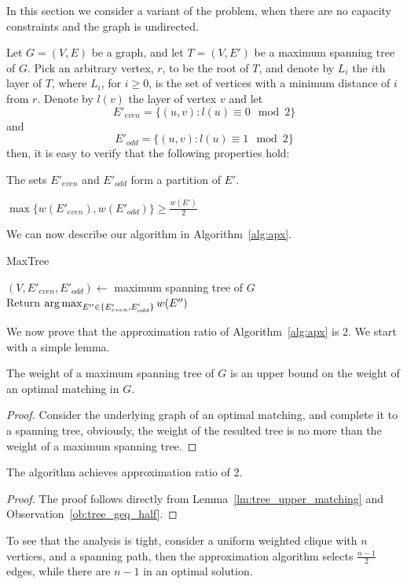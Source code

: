 \label{sub:ucudcm}
In this section we consider a variant of the problem, 
when there are no capacity constraints and the graph is undirected.

Let $G = (V, E)$ be a graph, 
and let $T = (V, E')$ be a maximum spanning tree of $G$.
Pick an arbitrary vertex, $r$, to be the root of $T$, 
and denote by $L_i$ the $i$th layer of $T$, 
where $L_i$, for $i \geq 0$, is the set of vertices with a minimum distance of $i$ from $r$.
Denote by $l(v)$ the layer of vertex $v$ and let 
$$ E'_{even} = \{ (u, v) : l(u) \equiv 0 \mod 2 \} $$
and    
$$ E'_{odd} = \{ (u, v) : l(u) \equiv 1 \mod 2 \} $$
then, it is easy to verify that the following properties hold:

\begin{observation}
The sets $E'_{even}$ and $E'_{odd}$ form a partition of $E'$. 
\end{observation}

\begin{observation}
\label{ob:tree_geq_half}
$ \max\{w(E'_{even}), w(E'_{odd})\}  \geq \frac{w(E')}{2} $
\end{observation}

We can now describe our algorithm in Algorithm~\ref{alg:apx}.

\begin{algorithm}
\label{alg:apx}
\caption{MaxTree}
$(V, E'_{even}, E'_{odd}) \leftarrow$ maximum spanning tree of $G$		\\
Return $\operatorname*{arg\,max}_{E'' \in \{ E'_{even}, E'_{odd} \}}{w(E'')} $	\\
\end{algorithm}

We now prove that the approximation ratio of Algorithm~\ref{alg:apx} is 2.
We start with a simple lemma.

\begin{lemma}
\label{lm:tree_upper_matching}
The weight of a maximum spanning tree of $G$ is an upper bound on the weight of
an optimal matching in $G$.
\end{lemma}

\begin{proof}
Consider the underlying graph of an optimal matching, and complete it to a spanning tree, obviously, the
weight of the resulted tree is no more than the weight of a maximum spanning
tree.
\end{proof}

\begin{theorem}
The \UCUDCARPOOL{} algorithm achi\-eves approximation ratio of 2.
\end{theorem}

\begin{proof}
The proof follows directly from 
Lemma~\ref{lm:tree_upper_matching} and Observation~\ref{ob:tree_geq_half}.
\end{proof}

To see that the analysis is tight, 
consider a uniform weighted clique with $n$ vertices, 
and a spanning path, 
then the approximation algorithm selects $\frac{n - 1}{2}$ edges, 
while there are $n - 1$ in an optimal solution.  